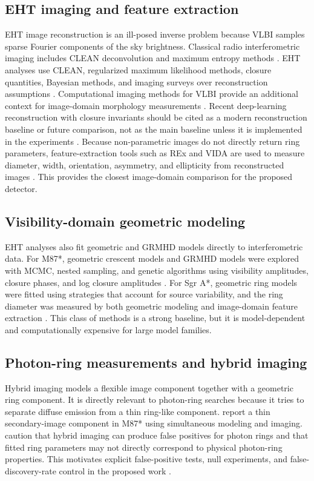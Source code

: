 \documentclass[11pt]{article}
\begin{document}
\subsection{EHT imaging and feature extraction}
EHT image reconstruction is an ill-posed inverse problem because VLBI samples sparse Fourier components of the sky brightness. Classical radio interferometric imaging includes CLEAN deconvolution and maximum entropy methods \citep{Hogbom1974,Cornwell1985,Sault1990,Cornwell2009,Thompson2017}. EHT analyses use CLEAN, regularized maximum likelihood methods, closure quantities, Bayesian methods, and imaging surveys over reconstruction assumptions \citep{Chael2018,EHTM87IV2019,EHTSgrAIII2022}. Computational imaging methods for VLBI provide an additional context for image-domain morphology measurements \citep{Bouman2016}. Recent deep-learning reconstruction with closure invariants should be cited as a modern reconstruction baseline or future comparison, not as the main baseline unless it is implemented in the experiments \citep{Lai2025}. Because non-parametric images do not directly return ring parameters, feature-extraction tools such as REx and VIDA are used to measure diameter, width, orientation, asymmetry, and ellipticity from reconstructed images \citep{TiedeVIDA2022,TiedeEllipticity2022}. This provides the closest image-domain comparison for the proposed detector.

\subsection{Visibility-domain geometric modeling}
EHT analyses also fit geometric and GRMHD models directly to interferometric data. For M87*, geometric crescent models and GRMHD models were explored with MCMC, nested sampling, and genetic algorithms using visibility amplitudes, closure phases, and log closure amplitudes \citep{KamruddinDexter2013,EHTM87VI2019}. For Sgr A*, geometric ring models were fitted using strategies that account for source variability, and the ring diameter was measured by both geometric modeling and image-domain feature extraction \citep{EHTSgrAIV2022}. This class of methods is a strong baseline, but it is model-dependent and computationally expensive for large model families.

\subsection{Photon-ring measurements and hybrid imaging}
Hybrid imaging models a flexible image component together with a geometric ring component. It is directly relevant to photon-ring searches because it tries to separate diffuse emission from a thin ring-like component. \citet{BroderickPhotonRing2022} report a thin secondary-image component in M87* using simultaneous modeling and imaging. \citet{TiedeNgEHT2022} caution that hybrid imaging can produce false positives for photon rings and that fitted ring parameters may not directly correspond to physical photon-ring properties. This motivates explicit false-positive tests, null experiments, and false-discovery-rate control in the proposed work \citep{BenjaminiHochberg1995}.
\end{document}
